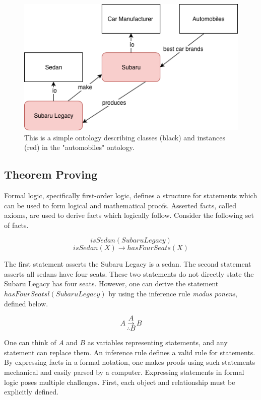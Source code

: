 \documentclass{article}
\begin{document}
\begin{figure}[h]
\centering
\includegraphics[scale=.5]{sample_ontology}
\caption{This is a simple ontology describing classes (black) and instances (red) in the "automobiles" ontology.}
\label{fig:sample_ontology}
\end{figure}

		\subsection{Theorem Proving}
Formal logic, specifically first-order logic, defines a structure for statements which can be used to form logical and mathematical proofs. Asserted facts, called axioms, are used to derive facts which logically follow. Consider the following set of facts. 
\begin{singlespace}
        \[isSedan(Subaru Legacy)\]
        \[isSedan(X) \rightarrow hasFourSeats(X)\]
 \end{singlespace} 
        
The first statement asserts the Subaru Legacy is a sedan. The second statement asserts all sedans have four seats. These two statements do not directly state the Subaru Legacy has four seats. However, one can derive the statement $hasFourSeatsl(Subaru Legacy)$ by using the inference rule \textit{modus ponens}, defined below. 
\begin{singlespace}
	 \[A\]
        \[A \rightarrow B\]
         \[\therefore B\]
\end{singlespace} 

One can think of $A$ and $B$ as variables representing statements, and any statement can replace them. An inference rule defines a valid rule for statements. By expressing facts in a formal notation, one makes proofs using such statements mechanical and easily parsed by a computer. Expressing statements in formal logic poses multiple challenges. First, each object and relationship must be explicitly defined.
\end{document}
